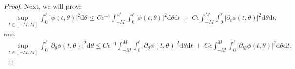 \documentclass[10pt, reqno]{amsart}
\numberwithin{equation}{section}
\theoremstyle{definition}
\newcommand{\e}{\epsilon}
\def\p{\partial}
\begin{document}
{{\begin{proof}
   Next, we will prove
\begin{align} \label{4-4026}
\sup_{t\in [-M, M] }     \int_0^{\ell}|\phi(t, \theta)|^2 {\mathrm d} \theta
  \leq
C\e^{-1} \int_{-M}^{M}  \int_0^{\ell}|\phi(t, \theta)|^2 {\mathrm d} \theta{\mathrm d} t
\ +\
C\e \int_{-M}^{M}  \int_0^{\ell} |\p_t\phi(t, \theta)|^2 {\mathrm d} \theta{\mathrm d} t,
\end{align}
   and
\begin{align} \label{4-4126}
 \sup_{t\in [-M, M] }     \int_0^{\ell} |\p_\theta\phi(t, \theta)|^2 {\mathrm d} \theta
\leq
C\e^{-1}  \int_{-M}^{M} \int_0^{\ell} |\p_\theta\phi(t, \theta)|^2 {\mathrm d} \theta{\mathrm d} t
\ +\
C\e  \int_{-M}^{M}  \int_0^{\ell} |\p_{t\theta}\phi(t, \theta)|^2 {\mathrm d} \theta{\mathrm d} t.
\end{align}


\end{proof}}}
\end{document}
